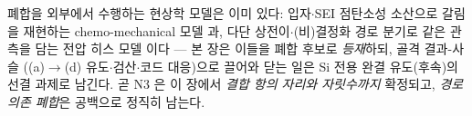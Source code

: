 폐합을 외부에서 수행하는 현상학 모델은 이미 있다: 입자$\cdot$SEI 점탄소성 소산으로 갈림을 재현하는
chemo-mechanical 모델\cite{koebbing2024} 과, 다단 상전이$\cdot$(비)결정화 경로 분기로 같은 관측을 담는
전압 히스 모델\cite{jiang_sihys2020} 이다 --- 본 장은 이들을 폐합 후보로 \emph{등재}하되, 골격 결과-사슬
((a)$\to$(d) 유도$\cdot$검산$\cdot$코드 대응)으로 끌어와 닫는 일은 Si 전용 완결 유도(후속)의 선결
과제로 남긴다. 곧 N3 은 이 장에서 \emph{결합 항의 자리와 자릿수까지} 확정되고, \emph{경로 의존 폐합}은
공백으로 정직히 남는다.


